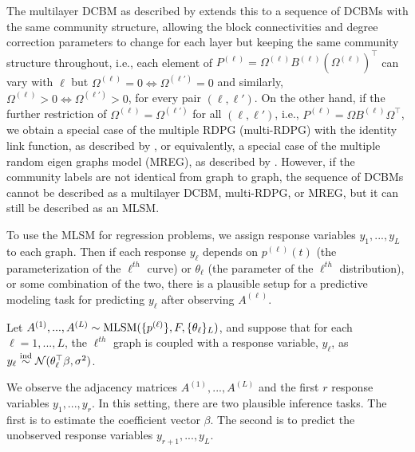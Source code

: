 \documentclass[12pt]{article}
\begin{document}
\begin{example}
The multilayer DCBM as described by \citet{agterberg2022joint} extends this to a sequence of DCBMs with the same community structure, allowing the block connectivities and degree correction parameters to change for each layer but keeping the same community structure throughout, i.e., each element of $P^{(\ell)} = \Omega^{(\ell)} B^{(\ell)} (\Omega^{(\ell)})^\top$ can vary with $\ell$ but $\Omega^{(\ell)} = 0 \iff \Omega^{(\ell')} = 0$ and similarly, $\Omega^{(\ell)} > 0 \iff \Omega^{(\ell')} > 0$, for every pair $(\ell, \ell')$. 
On the other hand, if the further restriction of $\Omega^{(\ell)} = \Omega^{(\ell')}$ for all $(\ell, \ell')$, i.e., $P^{(\ell)} = \Omega B^{(\ell)} \Omega^\top$, we obtain a special case of the multiple RDPG (multi-RDPG) with the identity link function, as described by \citet{nielsen2018multiple}, or equivalently, a special case of the multiple random eigen graphs model (MREG), as described by \citet{8889404}. 
However, if the community labels are not identical from graph to graph, the sequence of DCBMs cannot be described as a multilayer DCBM, multi-RDPG, or MREG, but it can still be described as an MLSM. 
\end{example}

To use the MLSM for regression problems, we assign response variables
\(y_1, ..., y_L\) to each graph. Then if each response \(y_\ell\)
depends on \(p^{(\ell)}(t)\) (the parameterization of the \(\ell^{th}\)
curve) or \(\theta_\ell\) (the parameter of the \(\ell^{th}\)
distribution), or some combination of the two, there is a plausible
setup for a predictive modeling task for predicting \(y_\ell\) after
observing \(A^{(\ell)}\).

\begin{definition}
\label{def:mlsm-r-1}
Let $A^{(1)}, ..., A^{(L)} \sim \mathrm{MLSM}(\{p^{(\ell)}\}, F, \{\theta_\ell\}_L)$, and suppose that for each $\ell = 1, ..., L$, the $\ell^{th}$ graph is coupled with a response variable, $y_\ell$, as $y_\ell \stackrel{\mathrm{ind}}{\sim} \mathcal{N}(\theta_\ell^\top \beta, \sigma^2)$. 

We observe the adjacency matrices $A^{(1)}, ..., A^{(L)}$ and the first $r$ response variables $y_1, ..., y_r$. 
In this setting, there are two plausible inference tasks. 
The first is to estimate the coefficient vector $\beta$. 
The second is to predict the unobserved response variables $y_{r+1}, ..., y_L$. 
\end{definition}
\end{document}
